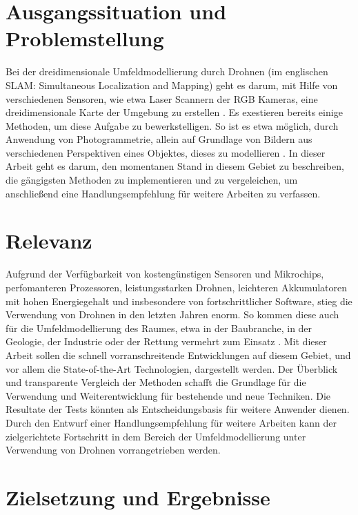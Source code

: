 \section{Ausgangssituation und Problemstellung}

Bei der dreidimensionale Umfeldmodellierung durch Drohnen (im englischen SLAM: Simultaneous Localization and Mapping) geht es darum, mit Hilfe von verschiedenen Sensoren, wie etwa Laser Scannern der RGB Kameras, eine dreidimensionale Karte der Umgebung zu erstellen \citet[1]{Li2016}. \newline
Es exestieren bereits einige Methoden, um diese Aufgabe zu bewerkstelligen. So ist es etwa möglich, durch Anwendung von Photogrammetrie, allein auf Grundlage von Bildern aus verschiedenen Perspektiven eines Objektes, dieses zu modellieren \citet[2]{Rem2011}. \newline
 In dieser Arbeit geht es darum, den momentanen Stand in diesem Gebiet zu beschreiben, die gängigsten Methoden zu implementieren und zu vergeleichen, um anschließend eine Handlungsempfehlung für weitere Arbeiten zu verfassen. 

    \section{Relevanz}

Aufgrund der Verfügbarkeit von kostengünstigen Sensoren und Mikrochips, perfomanteren Prozessoren, leistungsstarken Drohnen, leichteren Akkumulatoren mit hohen Energiegehalt und insbesondere von fortschrittlicher Software, stieg die Verwendung von Drohnen in den letzten Jahren enorm. So kommen diese auch für die Umfeldmodellierung des Raumes, etwa in der Baubranche, in der Geologie, der Industrie oder der Rettung vermehrt zum Einsatz \citet[3]{San}. \newline
Mit dieser Arbeit sollen die schnell vorranschreitende Entwicklungen auf diesem Gebiet, und vor allem die State-of-the-Art Technologien, dargestellt werden. Der Überblick und transparente Vergleich der Methoden schafft die Grundlage für die Verwendung und Weiterentwicklung für bestehende und neue Techniken. Die Resultate der Tests könnten als Entscheidungsbasis für weitere Anwender dienen. Durch den Entwurf einer Handlungsempfehlung für weitere Arbeiten kann der zielgerichtete Fortschritt in dem Bereich der Umfeldmodellierung unter Verwendung von Drohnen vorrangetrieben werden.


    \section{Zielsetzung und Ergebnisse}

